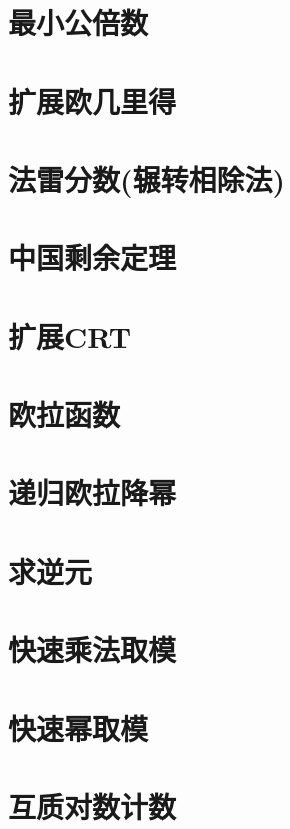 \section{最小公倍数}
\raggedbottom
\hrulefill
\section{扩展欧几里得}
\raggedbottom
\hrulefill
\section{法雷分数(辗转相除法)}
\raggedbottom
\hrulefill
\section{中国剩余定理}
\raggedbottom
\hrulefill
\section{扩展CRT}
\raggedbottom
\hrulefill
\section{欧拉函数}
\raggedbottom
\hrulefill
\section{递归欧拉降幂}
\raggedbottom
\hrulefill
\section{求逆元}
\raggedbottom
\hrulefill
\section{快速乘法取模}
\raggedbottom
\hrulefill
\section{快速幂取模}
\raggedbottom
\hrulefill
\section{互质对数计数}
\raggedbottom
\hrulefill
